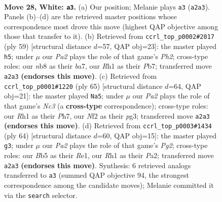 \documentclass[11pt]{article}
\begin{document}
\clearpage

\begin{figure}[p]\centering
\begin{subfigure}{0.46\textwidth}\centering
\resizebox{\linewidth}{!}{%
\newchessgame
\chessboard[
  setfen={rnb3k1/3n4/8/1B1p4/p7/6P1/PPP2N2/1K5R w - - 0 28},
  showmover=false,
  pgfstyle=straightmove, color=movearrow, markmove={a2-a3}
]}
\caption{}
\end{subfigure}\hfill
\begin{subfigure}{0.46\textwidth}\centering
\resizebox{\linewidth}{!}{%
\newchessgame
\chessboard[
  setfen={6k1/Bp3p1p/4n3/1N1rb1p1/8/5PP1/P6P/1R4K1 b - - 8 30},
  showmover=false,
  pgfstyle=straightmove, color=movearrow, markmove={h7-h5}
]}
\caption{}
\end{subfigure}
\\[4pt]
\begin{subfigure}{0.46\textwidth}\centering
\resizebox{\linewidth}{!}{%
\newchessgame
\chessboard[
  setfen={5bk1/7p/2nN2p1/2p5/4N3/1P1K2P1/7P/8 b - - 7 33},
  showmover=false,
  pgfstyle=straightmove, color=movearrow, markmove={c6-a5}
]}
\caption{}
\end{subfigure}\hfill
\begin{subfigure}{0.46\textwidth}\centering
\resizebox{\linewidth}{!}{%
\newchessgame
\chessboard[
  setfen={8/p4pk1/7p/7B/3rnP2/8/P5PP/4R1K1 w - - 2 33},
  showmover=false,
  pgfstyle=straightmove, color=movearrow, markmove={g2-g3}
]}
\caption{}
\end{subfigure}
\caption{\textbf{Move 28, White: \texttt{a3}.} (a) Our position; Melanie plays \texttt{a3} (\texttt{a2a3}). Panels (b)--(d) are the retrieved master positions whose correspondence most drove this move (highest QAP objective among those that transfer to it). (b) Retrieved from \texttt{ccrl\_top\_p0002\#2017} (ply 59) [structural distance $d$=57, QAP obj=23]: the master played \texttt{h5}; under $\mu$ our \emph{Pa2} plays the role of that game's \emph{Ph2}; cross-type roles: our \emph{n}b8 as their \emph{b}a7, our \emph{R}h1 as their \emph{P}b7; transferred move \texttt{a2a3} \textbf{(endorses this move)}. (c) Retrieved from \texttt{ccrl\_top\_p0001\#1220} (ply 65) [structural distance $d$=64, QAP obj=21]: the master played \texttt{Na5}; under $\mu$ our \emph{Pa2} plays the role of that game's \emph{Nc3} (a \textbf{cross-type} correspondence); cross-type roles: our \emph{R}h1 as their \emph{P}h7, our \emph{N}f2 as their \emph{p}g3; transferred move \texttt{a2a3} \textbf{(endorses this move)}. (d) Retrieved from \texttt{ccrl\_top\_p0003\#1434} (ply 64) [structural distance $d$=60, QAP obj=15]: the master played \texttt{g3}; under $\mu$ our \emph{Pa2} plays the role of that game's \emph{Pg2}; cross-type roles: our \emph{B}b5 as their \emph{R}e1, our \emph{R}h1 as their \emph{P}a2; transferred move \texttt{a2a3} \textbf{(endorses this move)}. Synthesis: 6 retrieved analogs transferred to \texttt{a3} (summed QAP objective 94, the strongest correspondence among the candidate moves); Melanie committed it via the \texttt{search} selector.}
\label{fig:thought-m54}
\end{figure}
\end{document}
